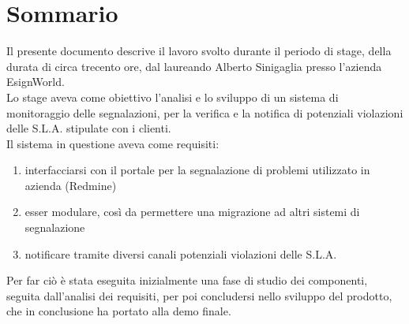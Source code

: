 
\cleardoublepage
{}
{}
\begingroup
\let\clearpage\relax
\let\cleardoublepage\relax
\let\cleardoublepage\relax

\chapter*{Sommario}

Il presente documento descrive il lavoro svolto durante il periodo di stage, della durata di circa trecento ore, dal laureando Alberto Sinigaglia presso l'azienda EsignWorld.\\
Lo stage aveva come obiettivo l'analisi e lo sviluppo di un sistema di monitoraggio delle segnalazioni, per la verifica e la notifica di potenziali violazioni delle S.L.A. stipulate con i clienti.\\
Il sistema in questione aveva come requisiti:
\begin{enumerate}
	\item interfacciarsi con il portale per la segnalazione di problemi utilizzato in azienda (Redmine)
	\item esser modulare, così da permettere una migrazione ad altri sistemi di segnalazione
	\item notificare tramite diversi canali potenziali violazioni delle S.L.A.
\end{enumerate}
Per far ciò è stata eseguita inizialmente una fase di studio dei componenti, seguita dall'analisi dei requisiti, per poi concludersi nello sviluppo del prodotto, che in conclusione ha portato alla demo finale.

%
%

\endgroup			

\vfill

